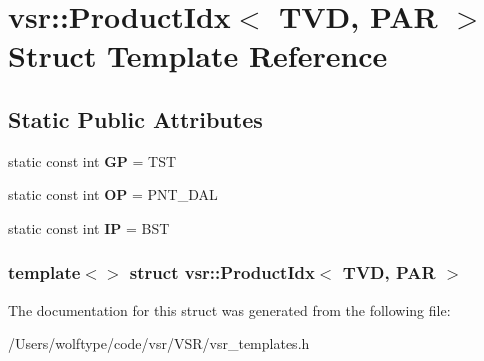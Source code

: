 \hypertarget{structvsr_1_1_product_idx_3_01_t_v_d_00_01_p_a_r_01_4}{\section{vsr\-:\-:Product\-Idx$<$ T\-V\-D, P\-A\-R $>$ Struct Template Reference}
\label{structvsr_1_1_product_idx_3_01_t_v_d_00_01_p_a_r_01_4}
}
\subsection*{Static Public Attributes}
\begin{DoxyCompactItemize}
\item 
\hypertarget{structvsr_1_1_product_idx_3_01_t_v_d_00_01_p_a_r_01_4_a96ca30b129e28936c5e27730a223e501}{static const int {\bfseries G\-P} = T\-S\-T}\label{structvsr_1_1_product_idx_3_01_t_v_d_00_01_p_a_r_01_4_a96ca30b129e28936c5e27730a223e501}

\item 
\hypertarget{structvsr_1_1_product_idx_3_01_t_v_d_00_01_p_a_r_01_4_a0cf06c7effe92a5035e37f0f9b026c1f}{static const int {\bfseries O\-P} = P\-N\-T\-\_\-\-D\-A\-L}\label{structvsr_1_1_product_idx_3_01_t_v_d_00_01_p_a_r_01_4_a0cf06c7effe92a5035e37f0f9b026c1f}

\item 
\hypertarget{structvsr_1_1_product_idx_3_01_t_v_d_00_01_p_a_r_01_4_a68c19b51aa75a3fdbdc3d4d7ea625b10}{static const int {\bfseries I\-P} = B\-S\-T}\label{structvsr_1_1_product_idx_3_01_t_v_d_00_01_p_a_r_01_4_a68c19b51aa75a3fdbdc3d4d7ea625b10}

\end{DoxyCompactItemize}
\subsubsection*{template$<$$>$ struct vsr\-::\-Product\-Idx$<$ T\-V\-D, P\-A\-R $>$}



The documentation for this struct was generated from the following file\-:\begin{DoxyCompactItemize}
\item 
/\-Users/wolftype/code/vsr/\-V\-S\-R/vsr\-\_\-templates.\-h\end{DoxyCompactItemize}
